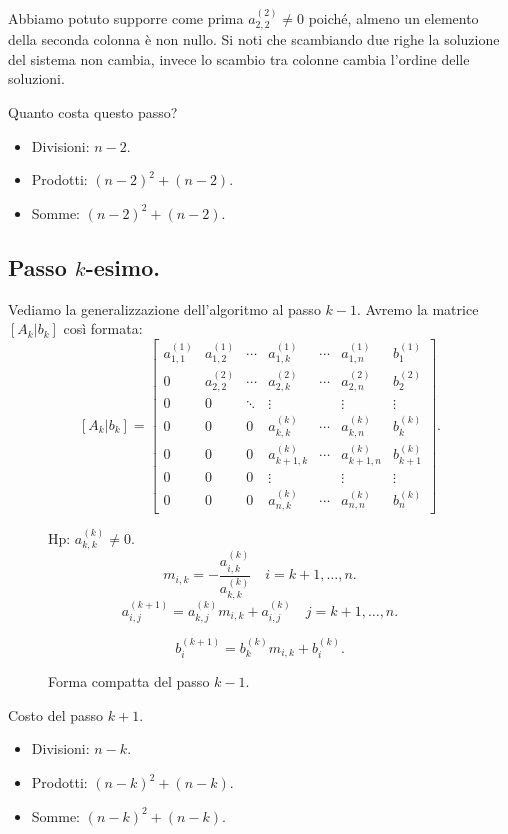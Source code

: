\begin{osse}\label{oss2.1}
Abbiamo potuto supporre come prima $a_{2,2}^{(2)} \neq 0$ poiché, almeno un
elemento
della seconda colonna è non nullo. Si noti che scambiando due righe la
soluzione del sistema non cambia, invece lo scambio tra colonne cambia
l'ordine delle soluzioni.
\end{osse}

Quanto costa questo passo?
\begin{itemize}
\item[]Divisioni: $n-2$.
\item[]Prodotti: $(n-2)^2 + (n-2)$.
\item[]Somme: $(n-2)^2 + (n-2)$.
\end{itemize}

\subsection{Passo $k$-esimo.}
Vediamo la generalizzazione dell'algoritmo al passo $k-1$. Avremo la matrice
$[A_k|b_k]$ così formata:
\[
[A_k|b_k] = \left[
\begin{array}{cccccc|c}
a_{1,1}^{(1)}&a_{1,2}^{(1)}& \cdots &a_{1,k}^{(1)}&\cdots& a_{1,n}^{(1)}&b_1^{(1)}\\
0 & a_{2,2}^{(2)} & \cdots & a_{2,k}^{(2)} & \cdots & a_{2,n}^{(2)} &  b_2^{(2)}\\
0 &0  & \ddots & \vdots &  & \vdots & \vdots\\
0 &0  &0 &a_{k,k}^{(k)} & \cdots & a_{k,n}^{(k)}&  b_k^{(k)}\\
0 &0  &0 &a_{k+1,k}^{(k)} & \cdots & a_{k+1,n}^{(k)}&  b_{k+1}^{(k)}\\
0 &0  &0 &\vdots &  & \vdots&  \vdots\\
0 &0  &0 &a_{n,k}^{(k)} & \cdots & a_{n,n}^{(k)} & b_n^{(k)}
\end{array} \right].
\]
\begin{figure}[h]
Hp: $a_{k,k}^{(k)} \neq 0$.
\[
m_{i,k} = -\frac{a_{i,k}^{(k)}}{a_{k,k}^{(k)}} \quad i = k+1, \ldots, n.
\]
\[
a_{i,j}^{(k+1)} = a_{k,j}^{(k)}m_{i,k} + a_{i,j}^{(k)} \quad j = k+1, \ldots, n.
\]

\[
b_i^{(k+1)} = b_k^{(k)}m_{i,k} + b_i^{(k)}.
\]
\caption{Forma compatta del passo $k-1$.}
\end{figure}

Costo del passo $k+1$.
\begin{itemize}
\item[]Divisioni: $n-k$.
\item[]Prodotti: $(n-k)^2 + (n-k)$.
\item[]Somme: $(n-k)^2 + (n-k)$.
\end{itemize}

